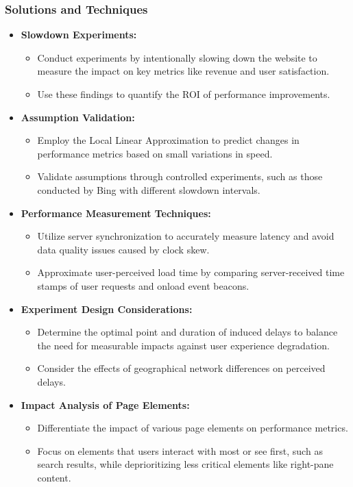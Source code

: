 \documentclass{article}
\begin{document}
\subsubsection*{Solutions and Techniques}
\begin{itemize}
    \item \textbf{Slowdown Experiments:}
    \begin{itemize}
        \item Conduct experiments by intentionally slowing down the website to measure the impact on key metrics like revenue and user satisfaction.
        \item Use these findings to quantify the ROI of performance improvements.
    \end{itemize}

    \item \textbf{Assumption Validation:}
    \begin{itemize}
        \item Employ the Local Linear Approximation to predict changes in performance metrics based on small variations in speed.
        \item Validate assumptions through controlled experiments, such as those conducted by Bing with different slowdown intervals.
    \end{itemize}

    \item \textbf{Performance Measurement Techniques:}
    \begin{itemize}
        \item Utilize server synchronization to accurately measure latency and avoid data quality issues caused by clock skew.
        \item Approximate user-perceived load time by comparing server-received time stamps of user requests and onload event beacons.
    \end{itemize}

    \item \textbf{Experiment Design Considerations:}
    \begin{itemize}
        \item Determine the optimal point and duration of induced delays to balance the need for measurable impacts against user experience degradation.
        \item Consider the effects of geographical network differences on perceived delays.
    \end{itemize}

    \item \textbf{Impact Analysis of Page Elements:}
    \begin{itemize}
        \item Differentiate the impact of various page elements on performance metrics.
        \item Focus on elements that users interact with most or see first, such as search results, while deprioritizing less critical elements like right-pane content.
    \end{itemize}


\end{itemize}
\end{document}
